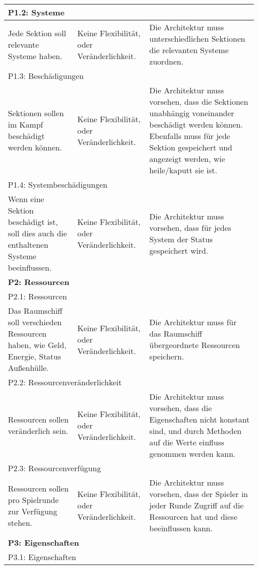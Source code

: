 \documentclass[fontsize=12pt,paper=a4,twoside]{scrartcl}
\begin{document}
\begin{longtable}[c]{|p{5cm}|p{5cm}|p{5cm}|}
\\ \hline 
\multicolumn{3}{|l|}{{P1.2: Systeme}} 
\\ \hline
Jede Sektion soll relevante Systeme haben.  & Keine Flexibilität, oder Veränderlichkeit.    & Die Architektur muss unterschiedlichen Sektionen die relevanten Systeme zuordnen. 
\\ \hline
\multicolumn{3}{|l|}{{P1.3: Beschädigungen}} 
\\ \hline
Sektionen sollen im Kampf beschädigt werden können.  & Keine Flexibilität, oder Veränderlichkeit.    & Die Architektur muss vorsehen, dass die Sektionen unabhängig voneinander beschädigt werden können. Ebenfalls muss für jede Sektion gespeichert und angezeigt werden, wie heile/kaputt sie ist. 
\\ \hline
\multicolumn{3}{|l|}{{P1.4: Systembeschädigungen}} 
\\ \hline
Wenn eine Sektion beschädigt ist, soll dies auch die enthaltenen Systeme beeinflussen. & Keine Flexibilität, oder Veränderlichkeit.    & Die Architektur muss vorsehen, dass für jedes System der Status gespeichert wird. 
\\ \hline
%
\multicolumn{3}{|l|}{{\textbf{P2: Ressourcen}}} 
\\ \hline
\multicolumn{3}{|l|}{{P2.1: Ressourcen}} 
\\ \hline
Das Raumschiff soll verschieden Ressourcen haben, wie Geld, Energie, Status Außenhülle.  & Keine Flexibilität, oder Veränderlichkeit.    & Die Architektur muss für das Raumschiff übergeordnete Ressourcen speichern. 
\\ \hline                                                      
\multicolumn{3}{|l|}{{P2.2: Ressourcenveränderlichkeit}} 
\\ \hline
Ressourcen sollen veränderlich sein. & Keine Flexibilität, oder Veränderlichkeit.    & Die Architektur muss vorsehen, dass die Eigenschaften nicht konstant sind, und durch Methoden auf die Werte einfluss genommen werden kann. 
\\ \hline
\multicolumn{3}{|l|}{{P2.3: Ressourcenverfügung}} 
\\ \hline
Ressourcen sollen pro Spielrunde zur Verfügung stehen. & Keine Flexibilität, oder Veränderlichkeit.    & Die Architektur muss vorsehen, dass der Spieler in jeder Runde Zugriff auf die Ressourcen hat und diese beeinflussen kann. 
\\ \hline
%
\multicolumn{3}{|l|}{{\textbf{P3: Eigenschaften}}} 
\\ \hline
\multicolumn{3}{|l|}{{P3.1: Eigenschaften}} 

\end{longtable}
\end{document}
